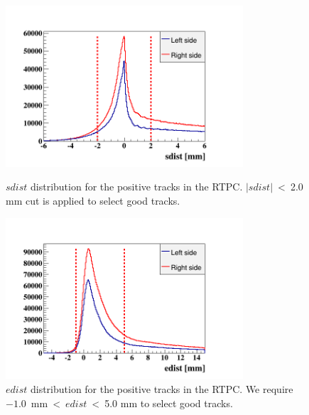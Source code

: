 \begin{itemize}
\begin{figure}[tbp]
\vspace{-0.3in}
\begin{minipage}[c]{.46\linewidth}
\hspace{-0.3in}
\includegraphics[height=6.0cm]{fig_analysis/rtpc_sdist.png}
\caption{$sdist$ distribution for the positive tracks in the RTPC. $|sdist|$~<~2.0 mm cut is applied to select good tracks.} 
\label{fig:rtpc_sdist}
\end{minipage} \hfill
\begin{minipage}[c]{.46\linewidth}
\hspace{-0.3in}
\includegraphics[height=6.0cm]{fig_analysis/rtpc_edist.png}
\caption{$edist$ distribution for the positive tracks in the RTPC. We require $-1.0$~mm~<~$edist$~<~5.0 mm to select good tracks.}
\label{fig:rtpc_edist}
\end{minipage}
\end{figure}


\end{itemize}
